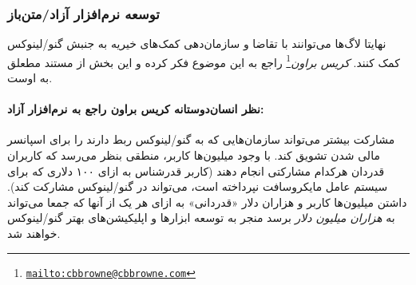 \subsubsection{توسعه نرم‌افزار آزاد/متن‌باز}

نهایتا لاگ‌ها می‌توانند با تقاضا و سازمان‌دهی کمک‌های خیریه
به جنبش گنو/لینوکس کمک کنند.
\emph{کریس براون}\footnote{\texttt{\url{mailto:cbbrowne@cbbrowne.com}}}
راجع به این موضوع فکر کرده و این بخش از مستند مطعلق به اوست.

\paragraph{نظر انسان‌دوستانه کریس براون راجع به نرم‌افزار آزاد:}


مشارکت بیشتر می‌تواند سازمان‌هایی که به گنو/لینوکس ربط دارند را
برای اسپانسر مالی شدن تشویق کند. با وجود میلیون‌ها کاربر، منطقی
بنظر می‌رسد که کاربران قدردان هرکدام مشارکتی انجام دهند
(کاربر قدرشناس به ازای ۱۰۰ دلاری که برای سیستم عامل مایکروسافت
نپرداخته است، می‌تواند در گنو/لینوکس مشارکت کند).
داشتن میلیون‌ها کاربر و هزاران دلار «قدردانی» به ازای هر یک از آنها
که جمعا می‌تواند به
{\itshape هزاران میلیون دلار}
برسد منجر به توسعه ابزار‌ها و اپلیکیشن‌های بهتر گنو/لینوکس خواهند شد.


